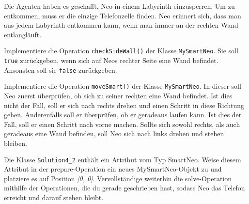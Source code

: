 
    Die Agenten haben es geschafft, Neo in einem Labyrinth einzusperren.
    Um zu entkommen, muss er die einzige Telefonzelle finden.
    Neo erinnert sich, dass man aus jedem Labyrinth entkommen kann, wenn man immer an der rechten Wand entlangläuft.

        \subexcercise Implementiere die Operation \lstinline{checkSideWall()} der Klasse \lstinline{MySmartNeo}.
        Sie soll \lstinline{true} zurückgeben, wenn sich auf Neos rechter Seite eine Wand befindet.
        Ansonsten soll sie \lstinline{false} zurückgeben.


        \subexcercise Implementiere die Operation \lstinline{moveSmart()} der Klasse \lstinline{MySmartNeo}.
        In dieser soll Neo zuerst überprüfen, ob sich zu seiner rechten eine Wand befindet.
        Ist dies nicht der Fall, soll er sich nach rechts drehen und einen Schritt in diese Richtung gehen.
        Anderenfalls soll er überprüfen, ob er geradeaus laufen kann. Ist dies der Fall, soll er einen Schritt nach vorne machen.
        Sollte sich sowohl rechts, als auch geradeaus eine Wand befinden, soll Neo sich nach links drehen und stehen bleiben.


        \subexcercise Die Klasse \lstinline{Solution4_2} enthält ein Attribut vom Typ SmartNeo.
        Weise diesem Attribut in der prepare-Operation ein neues MySmartNeo-Objekt zu und
        platziere es auf Position \emph{[0, 0]}.
        Vervollständige weiterhin die solve-Operation mithilfe der Operationen,
        die du gerade geschrieben hast, sodass Neo das Telefon erreicht und darauf stehen bleibt.


